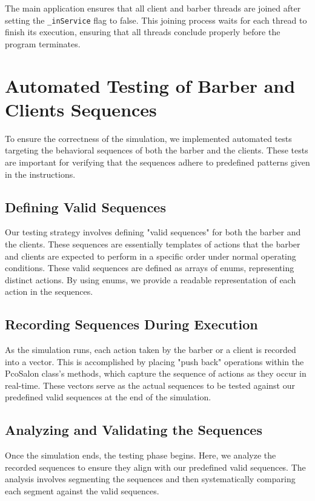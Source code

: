 \documentclass{article}
\begin{document}
    The main application ensures that all client and barber threads are joined after setting the \texttt{\_inService} flag to false. This joining process waits for each thread to finish its execution, ensuring that all threads conclude properly before the program terminates.

    \section{Automated Testing of Barber and Clients Sequences}

    To ensure the correctness of the simulation, we implemented automated tests targeting the behavioral sequences of both the barber and the clients. These tests are important for verifying that the sequences adhere to predefined patterns given in the instructions.

    \subsection{Defining Valid Sequences}

    Our testing strategy involves defining "valid sequences" for both the barber and the clients. These sequences are essentially templates of actions that the barber and clients are expected to perform in a specific order under normal operating conditions. These valid sequences are defined as arrays of enums, representing distinct actions. By using enums, we provide a readable representation of each action in the sequences.

    \subsection{Recording Sequences During Execution}

    As the simulation runs, each action taken by the barber or a client is recorded into a vector. This is accomplished by placing "push back" operations within the PcoSalon class's methods, which capture the sequence of actions as they occur in real-time. These vectors serve as the actual sequences to be tested against our predefined valid sequences at the end of the simulation.

    \subsection{Analyzing and Validating the Sequences}

    Once the simulation ends, the testing phase begins. Here, we analyze the recorded sequences to ensure they align with our predefined valid sequences. The analysis involves segmenting the sequences and then systematically comparing each segment against the valid sequences.
\end{document}

